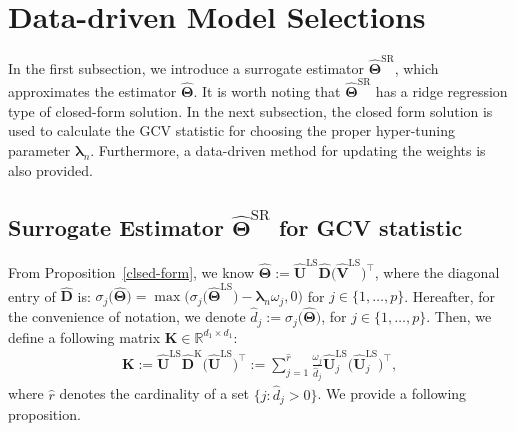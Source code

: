 \documentclass[alpha-refs]{wiley-article}
\begin{document}
\section{Data-driven Model Selections} \label{parameter_selection}
In the first subsection, we introduce a surrogate estimator $\widehat{\boldsymbol{\Theta}}^{\text{SR}}$, which approximates the estimator $\widehat{\boldsymbol{\Theta}}$.
It is worth noting that $\widehat{\boldsymbol{\Theta}}^{\text{SR}}$ has a ridge regression type of closed-form solution.
In the next subsection, the closed form solution is used to calculate the GCV statistic for choosing the proper hyper-tuning parameter  $\boldsymbol{\lambda}_{n}$.
Furthermore, a data-driven method for updating the weights is also provided.

\subsection{Surrogate Estimator $\widehat{\boldsymbol{\Theta}}^{\text{SR}}$ for GCV statistic}
From Proposition~\ref{clsed-form}, we know $\widehat{\boldsymbol{\Theta}} := \widehat{\boldsymbol{U}}^{\text{LS}}\widehat{\boldsymbol{D}}\big(\widehat{\boldsymbol{V}}^{\text{LS}}\big)^{\top}$,
where the diagonal entry of $\widehat{\boldsymbol{D}}$ is: $\sigma_{j}\big(\widehat{\boldsymbol{\Theta}}\big) = \max \big(  \sigma_{j}\big(\widehat{\boldsymbol{\Theta}}^{\text{LS}}\big)-\boldsymbol{\lambda}_{n} \omega_{j},0 \big)$ for $j\in\{1,\dots,p\}$.
Hereafter, for the convenience of notation, we denote $\widehat{d}_{j}:=\sigma_{j}\big(\widehat{\boldsymbol{\Theta}}\big)$, for $j\in\{1,\dots,p\}$.
Then, we define a following matrix $\boldsymbol{K}\in\mathbb{R}^{d_{1}\times d_{1}}$: 
\begin{align} \label{K}
    \boldsymbol{K}
    :=  \widehat{\boldsymbol{U}}^{\text{LS}} \widehat{\boldsymbol{D}}^{\text{K}} \big(\widehat{\boldsymbol{U}}^{\text{LS}} \big)^{\top}
    :=\sum_{j=1}^{\widehat{r}}
    \frac{\omega_{j}}{\widehat{d}_{j}}
    \widehat{\boldsymbol{U}}_{j}^{\text{LS}} \big(\widehat{\boldsymbol{U}}_{j}^{\text{LS}}\big)^{\top},
\end{align}
where $\widehat{r}$ denotes the cardinality of a set $\{j : \widehat{d}_{j}>0 \}$.
We provide a following proposition.
\end{document}
